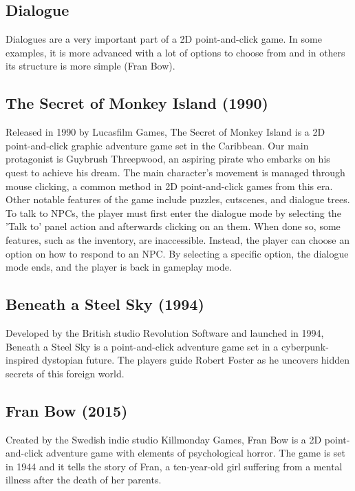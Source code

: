 \subsection{Dialogue}
Dialogues are a very important part of a 2D point-and-click game. In some examples, it is more advanced with a lot of options to choose from and in others its structure is more simple (Fran Bow).  







\subsection{The Secret of Monkey Island (1990)}
Released in 1990 by Lucasfilm Games, The Secret of Monkey Island is a 2D point-and-click graphic adventure game set in the Caribbean. Our main protagonist is Guybrush Threepwood, an aspiring pirate who embarks on his quest to achieve his dream.
The main character's movement is managed through mouse clicking, a common method in 2D point-and-click games from this era. Other notable features of the game include puzzles, cutscenes, and dialogue trees. To talk to NPCs, the player must first enter the dialogue mode by selecting the 'Talk to' panel action and afterwards clicking on an them. When done so, some features, such as the inventory, are inaccessible. Instead, the player can choose an option on how to respond to an NPC. By selecting a specific option, the dialogue mode ends, and the player is back in gameplay mode.

\subsection{Beneath a Steel Sky (1994)}
Developed by the British studio Revolution Software and launched in 1994, Beneath a Steel Sky is a point-and-click adventure game set in a cyberpunk-inspired dystopian future. The players guide Robert Foster as he uncovers hidden secrets of this foreign world.


\subsection{Fran Bow (2015)}
Created by the Swedish indie studio Killmonday Games, Fran Bow is a 2D point-and-click adventure game with elements of psychological horror. The game is set in 1944 and it tells the story of Fran, a ten-year-old girl suffering from a mental illness after the death of her parents.

